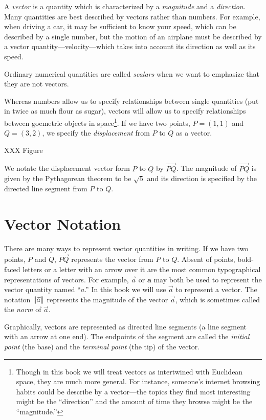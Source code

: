 A \emph{vector} is a quantity which is characterized by
a \emph{magnitude} and a \emph{direction}.   Many quantities are best
described by vectors rather than
numbers.  For example, when driving a car,
 it may be sufficient to
know your speed, which can be described by a single number,
 but the motion of an airplane must be described
by a vector quantity---velocity---which takes into account its
direction as well as its speed.

Ordinary numerical quantities are called \emph{scalars}
when we want to emphasize that they are not vectors.

Whereas numbers allow us to specify relationships between single quantities
(put in twice as much flour as sugar), vectors will allow us to specify
relationships between goemetric objects in space\footnote{
	Though in this book we will treat vectors as intertwined with Euclidean
	space, they are much more general.  For instance, someone's internet
	browsing habits could be describe by a vector---the topics they
	find most interesting might be the ``direction'' and the amount
	of time they browse might be the ``magnitude.''
}.  If we have two points, $P=(1,1)$ and $Q=(3,2)$, we specify the
\emph{displacement} from $P$ to $Q$ as a vector.

XXX Figure

We notate the displacement vector form $P$ to $Q$ by $\overrightarrow{PQ}$.
The magnitude of $\overrightarrow{PQ}$ is given by the Pythagorean theorem
to be $\sqrt{5}$ and its direction is specified by the directed line segment from
$P$ to $Q$.


\section{Vector Notation}
There are many ways to represent vector quantities in writing.  If
we have two points, $P$ and $Q$, $\overrightarrow{PQ}$ represents the
vector from $P$ to $Q$.  Absent of points, bold-faced letters or a letter
with an arrow over it are the most common typographical representations of vectors.
For example, $\vec a$ or $\mathbf{a}$ may both be used to represent the vector
quantity named ``$a$.''  In this book we will use $\vec a$ to represent a vector.
The notation $\lVert\vec a\rVert$\index{$\norm{\:\cdot\:}$}
represents the magnitude of the vector $\vec a$, which is sometimes called
the \emph{norm} of $\vec a$.

Graphically, vectors are represented as directed line segments (a
line segment with an arrow at one end).  The endpoints of the segment are called the 
\emph{initial
point} (the base) and the \emph{terminal point} (the tip) of the vector.

